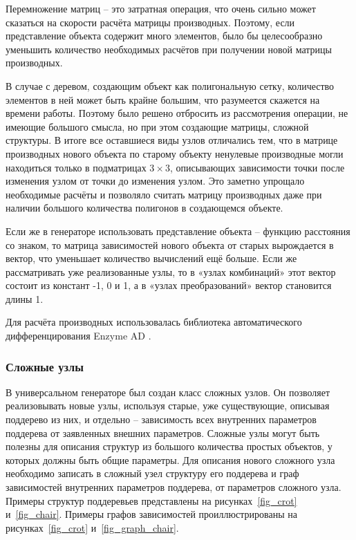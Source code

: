 \documentclass[a4paper,hidelinks,12pt]{article}
\begin{document}
\par
Перемножение матриц – это затратная операция, что очень сильно может сказаться на скорости расчёта матрицы производных. Поэтому, если представление объекта содержит много элементов, было бы целесообразно уменьшить количество необходимых расчётов при получении новой матрицы производных.
\par
В случае с деревом, создающим объект как полигональную сетку, количество элементов в ней может быть крайне большим, что разумеется скажется на времени работы. Поэтому было решено отбросить из рассмотрения операции, не имеющие большого смысла, но при этом создающие матрицы, сложной структуры. В итоге все оставшиеся виды узлов отличались тем, что в матрице производных нового объекта по старому объекту ненулевые производные могли находиться только в подматрицах $3 \times 3$, описывающих зависимости точки после изменения узлом от точки до изменения узлом. Это заметно упрощало необходимые расчёты и позволяло считать матрицу производных даже при наличии большого количества полигонов в создающемся объекте.
\par
Если же в генераторе использовать представление объекта – функцию расстояния со знаком, то матрица зависимостей нового объекта от старых вырождается в вектор, что уменьшает количество вычислений ещё больше. Если же рассматривать уже реализованные узлы, то в «узлах комбинаций» этот вектор состоит из констант -1, 0 и 1, а в «узлах преобразований» вектор становится длины 1.
\par
Для расчёта производных использовалась библиотека автоматического дифференцирования Enzyme AD \cite{NEURIPS2020_9332c513} \cite{10.1145/3458817.3476165} \cite{10.5555/3571885.3571964}.
\subsubsection{Сложные узлы}
В универсальном генераторе был создан класс сложных узлов. Он позволяет реализовывать новые узлы, используя старые, уже существующие, описывая поддерево из них, и отдельно – зависимость всех внутренних параметров поддерева от заявленных внешних параметров. Сложные узлы могут быть полезны для описания структур из большого количества простых объектов, у которых должны быть общие параметры. Для описания нового сложного узла необходимо записать в сложный узел структуру его поддерева и граф зависимостей внутренних параметров поддерева, от параметров сложного узла. Примеры структур поддеревьев представлены на рисунках~\ref{fig_crot} и~\ref{fig_chair}. Примеры графов зависимостей проиллюстрированы на рисунках~\ref{fig_crot} и~\ref{fig_graph_chair}.
\end{document}
